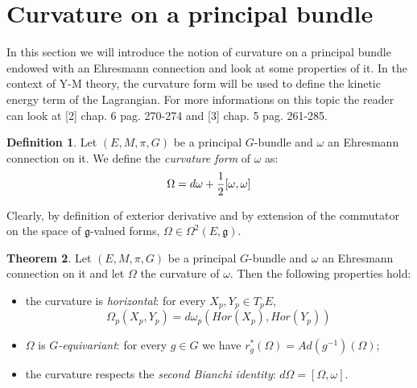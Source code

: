 \documentclass[12pt,a4paper]{report}
\theoremstyle{definition}
\newtheorem{Def}{Definition}[chapter]
\theoremstyle{Theorem}
\newtheorem{Theo}[Def]{Theorem}
\theoremstyle{definition}
\theoremstyle{definition}
\begin{document}
	\section{Curvature on a principal bundle}
	In this section we will introduce the notion of curvature on a principal bundle endowed with an Ehresmann connection and look at some properties of it. In the context of Y-M theory, the curvature form will be used to define the kinetic energy term of the Lagrangian. For more informations on this topic the reader can look at [2] chap. 6 pag. 270-274 and [3] chap. 5 pag. 261-285.
	\begin{Def}
		Let $(E,M,\pi,G)$ be a principal $G$-bundle and $\omega$ an Ehresmann connection on it. We define the \textit{curvature form} of $\omega$ as:
		$$\Omega=d\omega+{1\over 2}[\omega,\omega]$$
	\end{Def}
	Clearly, by definition of exterior derivative and by extension of the commutator on the space of $\mathfrak{g}$-valued forms, $\Omega\in \Omega^2(E,\mathfrak{g})$. 
	\begin{Theo}\label{Theo_5.5.1}
		Let $(E,M,\pi,G)$ be a principal $G$-bundle and $\omega$ an Ehresmann connection on it and let $\Omega$ the curvature of $\omega$. Then the following properties hold:
		\begin{itemize}
			\item the curvature is \textit{horizontal}: for every $X_p,Y_p\in T_pE$,
			$$\Omega_p(X_p,Y_p)=d\omega_p(Hor(X_p),Hor(Y_p))$$
			\item $\Omega$ is \textit{$G$-equivariant}: for every $g\in G$ we have $r^*_g(\Omega)=Ad(g^{-1})(\Omega)$;
			\item the curvature respects the \textit{second Bianchi identity}: $d\Omega=[\Omega,\omega]$.
		\end{itemize}
	\end{Theo}
\end{document}
